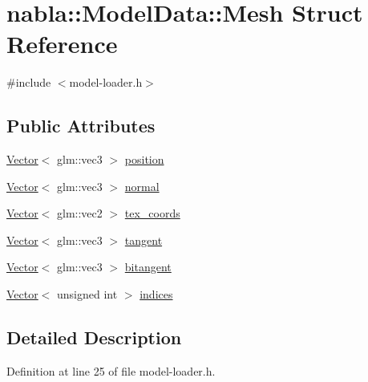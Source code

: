 \hypertarget{structnabla_1_1_model_data_1_1_mesh}{}\section{nabla\+::Model\+Data\+::Mesh Struct Reference}
\label{structnabla_1_1_model_data_1_1_mesh}


{\ttfamily \#include $<$model-\/loader.\+h$>$}

\subsection*{Public Attributes}
\begin{DoxyCompactItemize}
\item 
\mbox{\hyperlink{namespacenabla_a34f7ca8c9af290f9af3ed299236ff959}{Vector}}$<$ glm\+::vec3 $>$ \mbox{\hyperlink{structnabla_1_1_model_data_1_1_mesh_aee38e2512ccdf3b19d764ce5cb9722dc}{position}}
\item 
\mbox{\hyperlink{namespacenabla_a34f7ca8c9af290f9af3ed299236ff959}{Vector}}$<$ glm\+::vec3 $>$ \mbox{\hyperlink{structnabla_1_1_model_data_1_1_mesh_ae4ed9896e1991cf26b0e8400691c4db7}{normal}}
\item 
\mbox{\hyperlink{namespacenabla_a34f7ca8c9af290f9af3ed299236ff959}{Vector}}$<$ glm\+::vec2 $>$ \mbox{\hyperlink{structnabla_1_1_model_data_1_1_mesh_ac2e9894e06bb2bd2306615954c7dcdbe}{tex\+\_\+coords}}
\item 
\mbox{\hyperlink{namespacenabla_a34f7ca8c9af290f9af3ed299236ff959}{Vector}}$<$ glm\+::vec3 $>$ \mbox{\hyperlink{structnabla_1_1_model_data_1_1_mesh_a4d7c587c73e9cc567b039a7be53972e2}{tangent}}
\item 
\mbox{\hyperlink{namespacenabla_a34f7ca8c9af290f9af3ed299236ff959}{Vector}}$<$ glm\+::vec3 $>$ \mbox{\hyperlink{structnabla_1_1_model_data_1_1_mesh_a3ad6246750089694a168d22277dc4971}{bitangent}}
\item 
\mbox{\hyperlink{namespacenabla_a34f7ca8c9af290f9af3ed299236ff959}{Vector}}$<$ unsigned int $>$ \mbox{\hyperlink{structnabla_1_1_model_data_1_1_mesh_a7bfc90e899a5ce03f521165e47324dab}{indices}}
\end{DoxyCompactItemize}


\subsection{Detailed Description}


Definition at line 25 of file model-\/loader.\+h.



